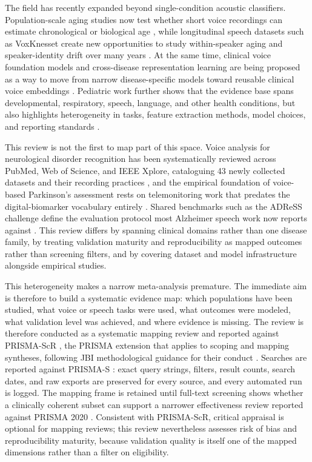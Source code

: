 \documentclass[11pt]{article}
\begin{document}
The field has recently expanded beyond single-condition acoustic classifiers. Population-scale aging studies now test whether short voice recordings can estimate chronological or biological age \citep{krongauz2026sound}, while longitudinal speech datasets such as VoxKnesset create new opportunities to study within-speaker aging and speaker-identity drift over many years \citep{marmor2026voxknesset}. At the same time, clinical voice foundation models and cross-disease representation learning are being proposed as a way to move from narrow disease-specific models toward reusable clinical voice embeddings \citep{elemento2026voicefm}. Pediatric work further shows that the evidence base spans developmental, respiratory, speech, language, and other health conditions, but also highlights heterogeneity in tasks, feature extraction methods, model choices, and reporting standards \citep{rogers2024pediatric}.

This review is not the first to map part of this space. Voice analysis for neurological disorder recognition has been systematically reviewed across PubMed, Web of Science, and IEEE Xplore, cataloguing 43 newly collected datasets and their recording practices \citep{hecker2022voice}, and the empirical foundation of voice-based Parkinson's assessment rests on telemonitoring work that predates the digital-biomarker vocabulary entirely \citep{tsanas2010telemonitoring}. Shared benchmarks such as the ADReSS challenge define the evaluation protocol most Alzheimer speech work now reports against \citep{luz2020adress}. This review differs by spanning clinical domains rather than one disease family, by treating validation maturity and reproducibility as mapped outcomes rather than screening filters, and by covering dataset and model infrastructure alongside empirical studies.

This heterogeneity makes a narrow meta-analysis premature. The immediate aim is therefore to build a systematic evidence map: which populations have been studied, what voice or speech tasks were used, what outcomes were modeled, what validation level was achieved, and where evidence is missing. The review is therefore conducted as a systematic mapping review and reported against PRISMA-ScR \citep{tricco2018prismascr}, the PRISMA extension that applies to scoping and mapping syntheses, following JBI methodological guidance for their conduct \citep{peters2020jbiscoping}. Searches are reported against PRISMA-S \citep{rethlefsen2021prismas}: exact query strings, filters, result counts, search dates, and raw exports are preserved for every source, and every automated run is logged. The mapping frame is retained until full-text screening shows whether a clinically coherent subset can support a narrower effectiveness review reported against PRISMA 2020 \citep{page2021prisma}. Consistent with PRISMA-ScR, critical appraisal is optional for mapping reviews; this review nevertheless assesses risk of bias and reproducibility maturity, because validation quality is itself one of the mapped dimensions rather than a filter on eligibility.
\end{document}

